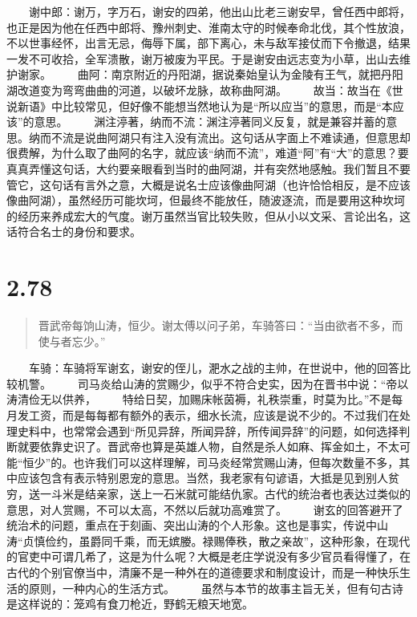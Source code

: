 \documentclass[]{book}
\begin{document}
　　谢中郎：谢万，字万石，谢安的四弟，他出山比老三谢安早，曾任西中郎将，也正是因为他在任西中郎将、豫州刺史、淮南太守的时候奉命北伐，其个性放浪，不以世事经怀，出言无忌，侮辱下属，部下离心，未与敌军接仗而下令撤退，结果一发不可收拾，全军溃散，谢万被废为平民。于是谢安由远志变为小草，出山去维护谢家。
　　曲阿：南京附近的丹阳湖，据说秦始皇认为金陵有王气，就把丹阳湖改道变为弯弯曲曲的河道，以破坏龙脉，故称曲阿湖。
　　故当：故当在《世说新语》中比较常见，但好像不能想当然地认为是``所以应当''的意思，而是``本应该''的意思。
　　渊注渟著，纳而不流：渊注渟著同义反复，就是兼容并蓄的意思。纳而不流是说曲阿湖只有注入没有流出。这句话从字面上不难读通，但意思却很费解，为什么取了曲阿的名字，就应该``纳而不流''，难道``阿''有``大''的意思？要真真弄懂这句话，大约要亲眼看到当时的曲阿湖，并有突然地感触。我们暂且不要管它，这句话有言外之意，大概是说名士应该像曲阿湖（也许恰恰相反，是不应该像曲阿湖），虽然经历可能坎坷，但最终不能放任，随波逐流，而是要用这种坎坷的经历来养成宏大的气度。谢万虽然当官比较失败，但从小以文采、言论出名，这话符合名士的身份和要求。　　

\section{2.78}\label{section-124}

\begin{quote}
晋武帝每饷山涛，恒少。谢太傅以问子弟，车骑答曰：``当由欲者不多，而使与者忘少。''
\end{quote}

　　车骑：车骑将军谢玄，谢安的侄儿，淝水之战的主帅，在世说中，他的回答比较机警。
　　司马炎给山涛的赏赐少，似乎不符合史实，因为在晋书中说：``帝以涛清俭无以供养，
　　特给日契，加赐床帐茵褥，礼秩崇重，时莫为比。''不是每月发工资，而是每每都有额外的表示，细水长流，应该是说不少的。不过我们在处理史料中，也常常会遇到``所见异辞，所闻异辞，所传闻异辞''的问题，如何选择判断就要依靠史识了。晋武帝也算是英雄人物，自然是杀人如麻、挥金如土，不太可能``恒少''的。也许我们可以这样理解，司马炎经常赏赐山涛，但每次数量不多，其中应该包含有表示特别恩宠的意思。当然，我老家有句谚语，大抵是见到别人贫穷，送一斗米是结亲家，送上一石米就可能结仇家。古代的统治者也表达过类似的意思，对人赏赐，不可以太高，不然以后就功高难赏了。
　　谢玄的回答避开了统治术的问题，重点在于刻画、突出山涛的个人形象。这也是事实，传说中山涛``贞慎俭约，虽爵同千乘，而无嫔媵。禄赐俸秩，散之亲故''，这种形象，在现代的官吏中可谓几希了，这是为什么呢？大概是老庄学说没有多少官员看得懂了，在古代的个别官僚当中，清廉不是一种外在的道德要求和制度设计，而是一种快乐生活的原则，一种内心的生活方式。
　　虽然与本节的故事主旨无关，但有句古诗是这样说的：笼鸡有食刀枪近，野鹤无粮天地宽。
\end{document}
